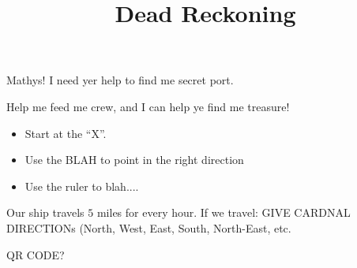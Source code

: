 \documentclass{../exhibit}
\title{Dead Reckoning}
\begin{document}
\begin{context}
  Mathys! I need yer help to find me secret port. 


  \vspace{1cm}

  
  Help me feed me crew, and I can help ye find me treasure!
\end{context}



\begin{directions}
  \begin{itemize}
  \item Start at the ``X''.
  \item Use the BLAH to point in the right direction
    \item Use the ruler to blah....
  \end{itemize}
  
\end{directions}



\begin{example}
  Our ship travels $5$ miles for every hour. If we travel: GIVE CARDNAL DIRECTIONs (North, West, East, South, North-East, etc. 
\begin{center}
\end{center}
\end{example}



\begin{mathConnections}
  QR CODE?
\end{mathConnections}
\end{document}
